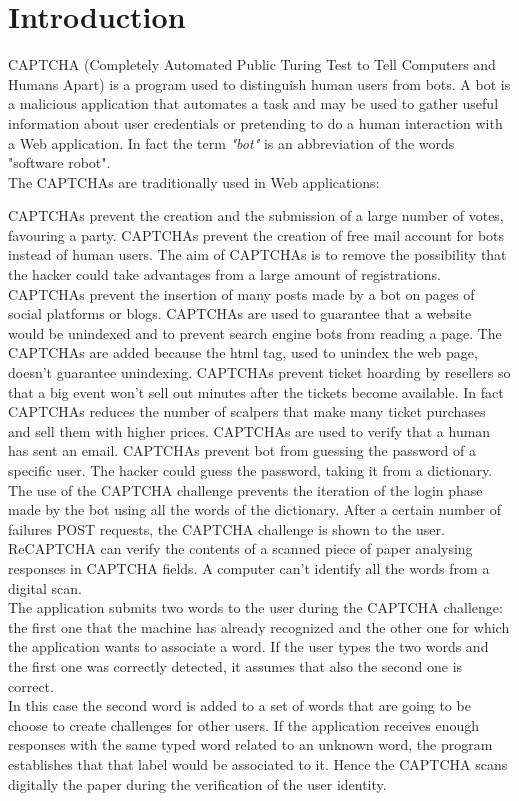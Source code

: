 \chapter{Introduction}
CAPTCHA (Completely Automated Public Turing Test to Tell Computers and Humans Apart) is a program used to distinguish human users from bots. A bot is a malicious application that automates a task and may be used to gather useful information about user credentials or pretending to do a human interaction with a Web application. In fact the term \textit{"bot"} is an abbreviation of the words "software robot".\\
The CAPTCHAs are traditionally used in Web applications\cite{text_audio}:
\begin{itemize}
{CAPTCHAs prevent the creation and the submission of a large number of votes, favouring a party.}
{CAPTCHAs prevent the creation of free mail account for bots instead of human users. The aim of CAPTCHAs is to remove the possibility that the hacker could take advantages from a large amount of registrations.}
{CAPTCHAs prevent the insertion of many posts made by a bot on pages of social platforms or blogs.}
{CAPTCHAs are used to guarantee that a website would be unindexed and to prevent search engine bots from reading a page. The CAPTCHAs are added because the html tag, used to unindex the web page, doesn't guarantee unindexing.}
{CAPTCHAs prevent ticket hoarding by resellers so that a big event won't sell out minutes after the tickets become available. In fact CAPTCHAs reduces the number of scalpers that make many ticket purchases and sell them with higher prices.}
{CAPTCHAs are used to verify that a human has sent an email.}
{CAPTCHAs prevent bot from guessing the password of a specific user. The hacker could guess the password, taking it from a dictionary. The use of the CAPTCHA challenge prevents the iteration of the login phase made by the bot using all the words of the dictionary. After a certain number of failures POST requests, the CAPTCHA challenge is shown to the user.}
{ReCAPTCHA can verify the contents of a scanned piece of paper analysing responses in CAPTCHA fields. A computer can't identify all the words from a digital scan.\\
The application submits two words to the user during the CAPTCHA challenge: the first one that the machine has already recognized and the other one for which the application wants to associate a word. If the user types the two words and the first one was correctly detected, it assumes that also the second one is correct.\\
In this case the second word is added to a set of words that are going to be choose to create challenges for other users. If the application receives enough responses with the same typed word related to an unknown word, the program establishes that that label would be associated to it. Hence the CAPTCHA scans digitally the paper during the verification of the user identity.}
\end{itemize}
